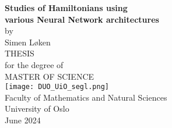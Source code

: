 \documentclass[12pt]{article}
\begin{document}
\thispagestyle{empty}
\begin{center} \vspace{1cm}
    \textbf{\Large{Studies of Hamiltonians using \\
various Neural Network architectures}}\\ \vspace{0.5cm}
    \small{by}\\ \vspace{0.5cm}
    \large{Simen Løken}\\ \vspace{4.4cm}
    \large{THESIS}\\ \vspace{0.3cm}
    \small{for the degree of}\\ \vspace{0.3cm}
    \large{MASTER OF SCIENCE}\\ \vspace{0.7cm}
    \texttt{[image: DUO\_UiO\_segl.png]} \\ \vspace{0.5cm}
    \large{Faculty of Mathematics and Natural Sciences \\ University of Oslo} \\ \vspace{0.5cm}
    \small{June 2024}\\ \vfill
\end{center}
\newpage
\vspace*{\fill}
\end{document}
